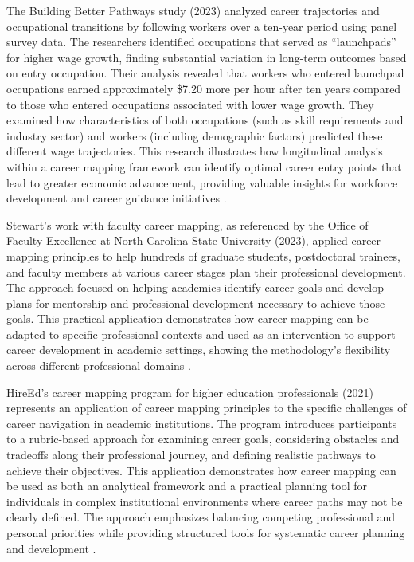 \documentclass[../main.tex]{subfiles}
\begin{document}
The Building Better Pathways study (2023) analyzed career trajectories and occupational transitions by following workers over a ten-year period using panel survey data. The researchers identified occupations that served as ``launchpads'' for higher wage growth, finding substantial variation in long-term outcomes based on entry occupation. Their analysis revealed that workers who entered launchpad occupations earned approximately \$7.20 more per hour after ten years compared to those who entered occupations associated with lower wage growth. They examined how characteristics of both occupations (such as skill requirements and industry sector) and workers (including demographic factors) predicted these different wage trajectories. This research illustrates how longitudinal analysis within a career mapping framework can identify optimal career entry points that lead to greater economic advancement, providing valuable insights for workforce development and career guidance initiatives \parencite{workforcegps2023}.

Stewart's work with faculty career mapping, as referenced by the Office of Faculty Excellence at North Carolina State University (2023), applied career mapping principles to help hundreds of graduate students, postdoctoral trainees, and faculty members at various career stages plan their professional development. The approach focused on helping academics identify career goals and develop plans for mentorship and professional development necessary to achieve those goals. This practical application demonstrates how career mapping can be adapted to specific professional contexts and used as an intervention to support career development in academic settings, showing the methodology's flexibility across different professional domains \parencite{ncsu2023}.

HireEd's career mapping program for higher education professionals (2021) represents an application of career mapping principles to the specific challenges of career navigation in academic institutions. The program introduces participants to a rubric-based approach for examining career goals, considering obstacles and tradeoffs along their professional journey, and defining realistic pathways to achieve their objectives. This application demonstrates how career mapping can be used as both an analytical framework and a practical planning tool for individuals in complex institutional environments where career paths may not be clearly defined. The approach emphasizes balancing competing professional and personal priorities while providing structured tools for systematic career planning and development \parencite{hireed2021}.
\end{document}
